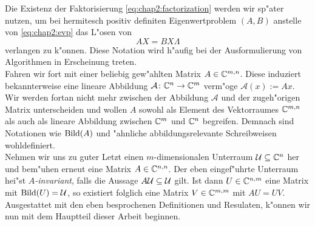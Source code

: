 Die Existenz der Faktorisierung \eqref{eq:chap2:factorization}
werden wir sp"ater nutzen, um bei hermitesch positiv definiten Eigenwertproblem $(A,B)$ anstelle von \eqref{eq:chap2:evp} das L"osen von
\begin{equation}\label{eq:chap2:evpMatrix2}
AX = BX\Lambda
\end{equation}
verlangen zu k"onnen. Diese Notation wird h"aufig bei der Ausformulierung von Algorithmen in Erscheinung treten.\\

Fahren wir fort mit einer beliebig gew"ahlten Matrix $A\in\mathbb{C}^{m,n}$. Diese induziert bekannterweise eine lineare Abbildung $\mathcal{A}\colon\mathbb{C}^n\to\mathbb{C}^{m}$ verm"oge $\mathcal{A}(x) := Ax$.
Wir werden fortan nicht mehr zwischen der Abbildung $\mathcal{A}$ und der zugeh"origen Matrix unterscheiden und wollen $A$ sowohl als Element des Vektorraumes $\mathbb{C}^{m,n}$
als auch als lineare Abbildung zwischen $\mathbb{C}^m$ und $\mathbb{C}^n$ begreifen. Demnach sind Notationen wie $\operatorname{Bild}(A)$ und "ahnliche abbildungsrelevante Schreibweisen wohldefiniert.\\

Nehmen wir uns zu guter Letzt einen $m$-dimensionalen Unterraum $\mathcal{U} \subseteq \mathbb{C}^n$ her und bem"uhen erneut eine Matrix $A\in\mathbb{C}^{n,n}$.
Der eben eingef"uhrte Unterraum hei"st \emph{$A$-invariant}, falls die Aussage $A\mathcal{U}\subseteq\mathcal{U}$ gilt.
Ist dann $U\in\mathbb{C}^{n,m}$ eine Matrix mit $\operatorname{Bild}(U)=\mathcal{U}$, so existiert folglich eine Matrix $V\in\mathbb{C}^{m,m}$ mit $AU = UV$.\\

Ausgestattet mit den eben besprochenen Definitionen und Resulaten, k"onnen wir nun mit dem Hauptteil dieser Arbeit beginnen.








